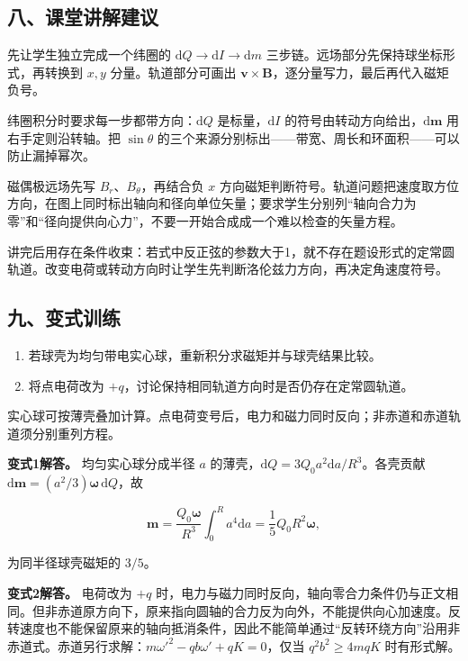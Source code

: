 \documentclass[12pt,a4paper,UTF8]{ctexart}
\newcommand{\tightlist}{\setlength{\itemsep}{0pt}\setlength{\parskip}{0pt}}
\begin{document}
\subsection{八、课堂讲解建议}\label{ux516bux8bfeux5802ux8bb2ux89e3ux5efaux8bae-3}

先让学生独立完成一个纬圈的 \(\mathrm dQ\to\mathrm dI\to\mathrm dm\)
三步链。远场部分先保持球坐标形式，再转换到 \(x,y\) 分量。轨道部分可画出
\(\boldsymbol v\times\boldsymbol B\)，逐分量写力，最后再代入磁矩负号。

纬圈积分时要求每一步都带方向：\(\mathrm dQ\) 是标量，\(\mathrm dI\)
的符号由转动方向给出，\(\mathrm d\boldsymbol m\) 用右手定则沿转轴。把
\(\sin\theta\)
的三个来源分别标出------带宽、周长和环面积------可以防止漏掉幂次。

磁偶极远场先写 \(B_r\)、\(B_\theta\)，再结合负 \(x\)
方向磁矩判断符号。轨道问题把速度取方位方向，在图上同时标出轴向和径向单位矢量；要求学生分别列``轴向合力为零''和``径向提供向心力''，不要一开始合成成一个难以检查的矢量方程。

讲完后用存在条件收束：若式中反正弦的参数大于1，就不存在题设形式的定常圆轨道。改变电荷或转动方向时让学生先判断洛伦兹力方向，再决定角速度符号。

\subsection{九、变式训练}\label{ux4e5dux53d8ux5f0fux8badux7ec3-3}

\begin{enumerate}
\def\labelenumi{\arabic{enumi}.}
\tightlist
\item
  若球壳为均匀带电实心球，重新积分求磁矩并与球壳结果比较。
\item
  将点电荷改为 \(+q\)，讨论保持相同轨道方向时是否仍存在定常圆轨道。
\end{enumerate}

实心球可按薄壳叠加计算。点电荷变号后，电力和磁力同时反向；非赤道和赤道轨道须分别重列方程。

\textbf{变式1解答。} 均匀实心球分成半径 \(a\)
的薄壳，\(\mathrm dQ=3Q_0a^2\mathrm da/R^3\)。各壳贡献
\(\mathrm d\boldsymbol m=(a^2/3)\boldsymbol\omega\,\mathrm dQ\)，故

\[\boldsymbol m=\frac{Q_0\boldsymbol\omega}{R^3}\int_0^R a^4\mathrm da=\frac15Q_0R^2\boldsymbol\omega,\]

为同半径球壳磁矩的 \(3/5\)。

\textbf{变式2解答。} 电荷改为 \(+q\)
时，电力与磁力同时反向，轴向零合力条件仍与正文相同。但非赤道原方向下，原来指向圆轴的合力反为向外，不能提供向心加速度。反转速度也不能保留原来的轴向抵消条件，因此不能简单通过``反转环绕方向''沿用非赤道式。赤道另行求解：\(m\omega'^2-qb\omega'+qK=0\)，仅当
\(q^2b^2\ge4mqK\) 时有形式解。
\end{document}
